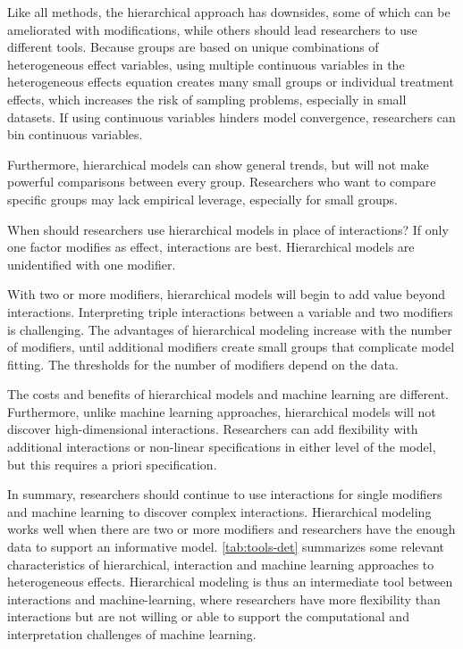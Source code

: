\documentclass[12pt]{article}
\begin{document}
Like all methods, the hierarchical approach has downsides, some of which can be ameliorated with modifications, while others should lead researchers to use different tools. 
Because groups are based on unique combinations of heterogeneous effect variables, using multiple continuous variables in the heterogeneous effects equation creates many small groups or individual treatment effects, which increases the risk of sampling problems, especially in small datasets. 
If using continuous variables hinders model convergence, researchers can bin continuous variables.


Furthermore, hierarchical models can show general trends, but will not make powerful comparisons between every group. 
Researchers who want to compare specific groups may lack empirical leverage, especially for small groups.



When should researchers use hierarchical models in place of interactions?
If only one factor modifies as effect, interactions are best. 
Hierarchical models are unidentified with one modifier. 


With two or more modifiers, hierarchical models will begin to add value beyond interactions. 
Interpreting triple interactions between a variable and two modifiers is challenging. 
The advantages of hierarchical modeling increase with the number of modifiers, until additional modifiers create small groups that complicate model fitting. 
The thresholds for the number of modifiers depend on the data. 


The costs and benefits of hierarchical models and machine learning are different. 
Furthermore, unlike machine learning approaches, hierarchical models will not discover high-dimensional interactions. 
Researchers can add flexibility with additional interactions or non-linear specifications in either level of the model, but this requires a priori specification. 


In summary, researchers should continue to use interactions for single modifiers and machine learning to discover complex interactions. 
Hierarchical modeling works well when there are two or more modifiers and researchers have the enough data to support an informative model.  
\autoref{tab:tools-det} summarizes some relevant characteristics of hierarchical, interaction and machine learning approaches to heterogeneous effects. 
Hierarchical modeling is thus an intermediate tool between interactions and machine-learning, where researchers have more flexibility than interactions but are not willing or able to support the computational and interpretation challenges of machine learning. 
\end{document}

